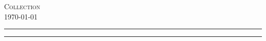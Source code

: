 
\usepackage{amsmath, environ}
%


\begin{center}
{\Huge \textsc{Collection}}\\ \today
\end{center}
\tableofcontents


%
%
\hrule

\hrule
